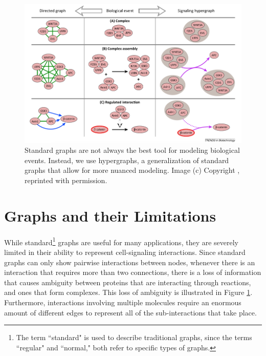 \documentclass[12pt,twoside]{reedthesis}
\theoremstyle{definition}
\begin{document}
\begin{figure}[h]
  \begin{center}
    \includegraphics[width=\textwidth]{anna_fig}
  \caption[The issue with standard graphs.]{Standard graphs are not always the best tool for modeling biological events. Instead, we use hypergraphs, a generalization of standard graphs that allow for more nuanced modeling. Image (c) Copyright \cite{Ritz2014a}, reprinted with permission.}
  \label{fig:anna_fig}
  \end{center}
\end{figure}

\section{Graphs and their Limitations}

While standard\footnote{The term ``standard" is used to describe traditional graphs, since the terms ``regular" and ``normal," both refer to specific types of graphs.} graphs are useful for many applications, they are severely limited in their ability to represent cell-signaling interactions.  Since standard graphs can only show pairwise interactions between nodes, whenever there is an interaction that requires more than two connections, there is a loss of information that causes ambiguity between proteins that are interacting through reactions, and ones that form complexes. This loss of ambiguity is illustrated in Figure \ref{fig:anna_fig}. Furthermore, interactions involving multiple molecules require an enormous amount of different edges to represent all of the sub-interactions that take place.\par
\end{document}

